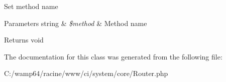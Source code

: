 Set method name


\begin{DoxyParams}[1]{Parameters}
string & {\em \$method} & Method name \\
\hline
\end{DoxyParams}
\begin{DoxyReturn}{Returns}
void 
\end{DoxyReturn}


The documentation for this class was generated from the following file\+:\begin{DoxyCompactItemize}
\item 
C\+:/wamp64/racine/www/ci/system/core/Router.\+php\end{DoxyCompactItemize}
